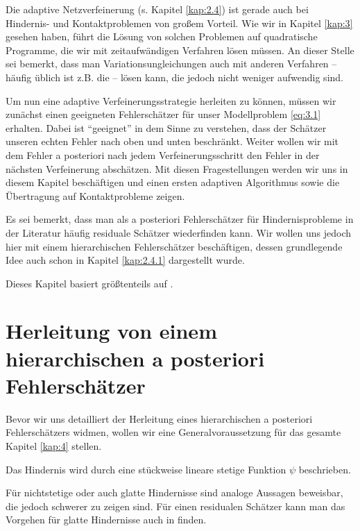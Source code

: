 \label{kap:4}


Die adaptive Netzverfeinerung (s. Kapitel \ref{kap:2.4}) ist gerade auch bei Hindernis- und Kontaktproblemen von großem Vorteil. Wie wir in Kapitel \ref{kap:3} gesehen haben, führt die Lösung von solchen Problemen auf quadratische Programme, die wir mit zeitaufwändigen Verfahren lösen müssen. An dieser Stelle sei bemerkt, dass man Variationsungleichungen auch mit anderen Verfahren – häufig üblich ist z.B. die \textit{} – lösen kann, die jedoch nicht weniger aufwendig sind.


Um nun eine adaptive Verfeinerungsstrategie herleiten zu können, müssen wir zunächst einen geeigneten Fehlerschätzer für unser Modellproblem \eqref{eq:3.1} erhalten. Dabei ist "`geeignet"' in dem Sinne zu verstehen, dass der Schätzer unseren echten Fehler nach oben und unten beschränkt. Weiter wollen wir mit dem Fehler a posteriori nach jedem Verfeinerungsschritt den Fehler in der nächsten Verfeinerung abschätzen. Mit diesen Fragestellungen werden wir uns in diesem Kapitel beschäftigen und einen ersten adaptiven Algorithmus sowie die Übertragung auf Kontaktprobleme zeigen.


Es sei bemerkt, dass man als a posteriori Fehlerschätzer für Hindernisprobleme in der Literatur häufig residuale Schätzer wiederfinden kann. Wir wollen uns jedoch hier mit einem hierarchischen Fehlerschätzer beschäftigen, dessen grundlegende Idee auch schon in Kapitel \ref{kap:2.4.1} dargestellt wurde.

Dieses Kapitel basiert größtenteils auf \cite{ZouVee}.




\section{Herleitung von einem hierarchischen a posteriori  Fehlerschätzer}
\label{kap:4.1}

Bevor wir uns detailliert der Herleitung eines hierarchischen a posteriori Fehlerschätzers widmen, wollen wir eine Generalvoraussetzung für das gesamte Kapitel \ref{kap:4} stellen.


\begin{vor}\label{vor:4.1}
Das Hindernis  wird durch eine stückweise lineare stetige Funktion $\psi$ beschrieben.
\end{vor}


Für nichtstetige oder auch glatte Hindernisse sind analoge Aussagen beweisbar, die jedoch schwerer zu zeigen sind. Für einen residualen Schätzer kann man das Vorgehen für glatte Hindernisse auch in \cite{Page} finden.







